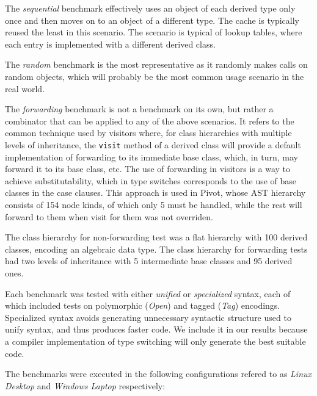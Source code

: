 \documentclass[preprint]{sigplanconf}
\makeatletter
\DeclareRobustCommand{\code}[1]{{\lstinline[breaklines=false,escapechar=@]{#1}}}
\makeatother
\begin{document}
The \emph{sequential} benchmark effectively uses an object of each derived type only 
once and then moves on to an object of a different type. The cache is typically 
reused the least in this scenario. The scenario is typical of lookup tables, 
where each entry is implemented with a different derived class.

The \emph{random} benchmark is the most representative as it randomly makes calls on 
random objects, which will probably be the most common usage scenario in the 
real world.

The \emph{forwarding} benchmark is not a benchmark on its own, but rather a 
combinator that can be applied to any of the above scenarios. It refers to the 
common technique used by visitors where, for class hierarchies with multiple 
levels of inheritance, the \code{visit} method of a derived class will provide a 
default implementation of forwarding to its immediate base class, which, in turn, 
may forward it to its base class, etc. The use of forwarding in visitors is a 
way to achieve substitutability, which in type switches corresponds to the use 
of base classes in the case clauses.
This approach is used in Pivot, whose AST 
hierarchy consists of 154 node kinds, of which only 5 must be handled, while the 
rest will forward to them when visit for them was not overriden.

The class hierarchy for non-forwarding test was a flat hierarchy with 100 
derived classes, encoding an algebraic data type. The class hierarchy for 
forwarding tests had two levels of inheritance with 5 intermediate base classes 
and 95 derived ones. 

Each benchmark was tested with either \emph{unified} or \emph{specialized} 
syntax, each of which included tests on polymorphic (\emph{Open}) and tagged 
(\emph{Tag}) encodings. Specialized syntax avoids generating unnecessary 
syntactic structure used to unify syntax, and thus produces faster code. We 
include it in our results because a compiler implementation of type switching 
will only generate the best suitable code.

The benchmarks were executed in the following configurations refered to as 
\emph{Linux Desktop} and \emph{Windows Laptop} respectively:
\end{document}
